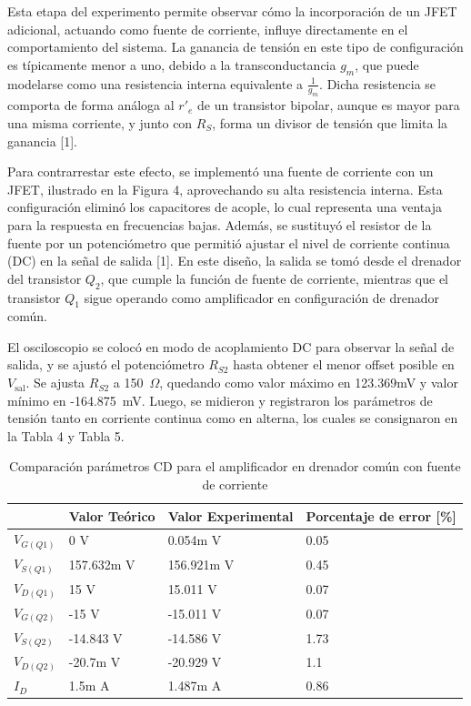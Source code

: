 \documentclass[journal]{IEEEtran}
\begin{document}
\par Esta etapa del experimento permite observar cómo la incorporación de un JFET adicional, actuando como fuente de corriente, influye directamente en el comportamiento del sistema. La ganancia de tensión en este tipo de configuración es típicamente menor a uno, debido a la transconductancia $g_m$, que puede modelarse como una resistencia interna equivalente a $\frac{1}{g_m}$. Dicha resistencia se comporta de forma análoga al $r'_e$ de un transistor bipolar, aunque es mayor para una misma corriente, y junto con $R_S$, forma un divisor de tensión que limita la ganancia [1].
\par Para contrarrestar este efecto, se implementó una fuente de corriente con un JFET, ilustrado en la Figura 4, aprovechando su alta resistencia interna. Esta configuración eliminó los capacitores de acople, lo cual representa una ventaja para la respuesta en frecuencias bajas. Además, se sustituyó el resistor de la fuente por un potenciómetro que permitió ajustar el nivel de corriente continua (DC) en la señal de salida [1]. En este diseño, la salida se tomó desde el drenador del transistor $Q_2$, que cumple la función de fuente de corriente, mientras que el transistor $Q_1$ sigue operando como amplificador en configuración de drenador común.
\par El osciloscopio se colocó en modo de acoplamiento DC para observar la señal de salida, y se ajustó el potenciómetro $R_{S2}$ hasta obtener el menor offset posible en $V_{\text{sal}}$. Se ajusta $R_{S2}$ a 150~$\Omega$, quedando como valor máximo en 123.369mV y valor mínimo en -164.875~mV. Luego, se midieron y registraron los parámetros de tensión tanto en corriente continua como en alterna, los cuales se consignaron en la Tabla 4 y Tabla 5. 
\begin{table}[h]
    \caption{Comparación parámetros CD para el amplificador en drenador común con fuente de corriente}
    \centering
    \renewcommand{\arraystretch}{1.2} %
    \begin{tabular}{|l|p{2cm}|p{2cm}|p{2cm}|}
        \hline
        & \textbf{Valor Teórico} & \textbf{Valor Experimental} & \textbf{Porcentaje de error [\%]} \\
        \hline
        \( V_{G(Q1)} \) & 0 V  & 0.054m V  & 0.05 \\
        \hline
        \( V_{S(Q1)} \) & 157.632m V   & 156.921m V  & 0.45 \\
        \hline
        \( V_{D(Q1)} \) & 15 V & 15.011 V & 0.07 \\
        \hline
        \( V_{G(Q2)} \) & -15 V  & -15.011 V  & 0.07 \\
        \hline
        \( V_{S(Q2)} \) & -14.843 V   & -14.586 V  & 1.73 \\
        \hline
        \( V_{D(Q2)} \) & -20.7m V & -20.929 V & 1.1 \\
        \hline
        \( I_D \) & 1.5m A & 1.487m A & 0.86 \\
        \hline
    \end{tabular}
    \label{tab:resistencias}
\end{table}
\end{document}
